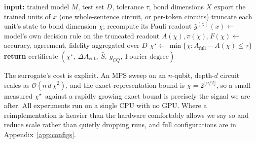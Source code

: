 \documentclass[10pt]{article}
\newcommand{\chistar}{\ensuremath{\chi^\star}}
\begin{document}
\begin{algorithm}[t]
\caption{\textsc{SimCert} bond-dimension audit for one trained model}
\label{alg:audit}
\begin{algorithmic}[1]
\State \textbf{input:} trained model $M$, test set $D$, tolerance $\tau$, bond dimensions $X$
  \State export the trained units of $x$ (one whole-sentence circuit, or per-token circuits)
    \State truncate each unit's state to bond dimension $\chi$; recompute its Pauli readout
    \State $\hat y^{(\chi)}(x)\gets$ model's own decision rule on the truncated readout
  \EndFor
\EndFor
\State $A(\chi),\pi(\chi),F(\chi)\gets$ accuracy, agreement, fidelity aggregated over $D$
\State $\chistar\gets\min\{\chi: A_{\mathrm{full}}-A(\chi)\le\tau\}$ 
\State \textbf{return} certificate $(\chistar,\ \Delta A_{\mathrm{ent}},\ \bar S,\ g_{CQ},\ \text{Fourier degree})$
\end{algorithmic}
\end{algorithm}


The surrogate's cost is explicit. An MPS sweep on an $n$-qubit, depth-$d$ circuit scales as
$\mathcal{O}(n\,d\,\chi^2)$, and the exact-representation bound is $\chi=2^{\lfloor n/2\rfloor}$, so
a small measured \chistar\ against a rapidly growing exact bound is precisely the signal we are
after. All experiments run on a single CPU with no GPU. Where a reimplementation is heavier than the
hardware comfortably allows we say so and reduce scale rather than quietly dropping runs, and full
configurations are in Appendix~\ref{app:configs}.
\end{document}
